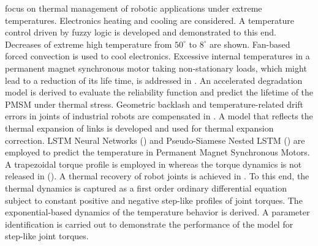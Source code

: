 \documentclass{ifacconf}
\begin{document}
\cite{afaq2023intelligent} focus on thermal management of robotic applications under extreme temperatures. Electronics heating and cooling are considered. A temperature control driven by fuzzy logic is developed and demonstrated to this end. Decreases of extreme high temperature from $50^{\circ}$ to $8^{\circ}$ are shown. Fan-based forced convection is used to cool electronics. Excessive internal temperatures in a permanent magnet synchronous motor  taking non-stationary loads, which might lead to a reduction of its life time, is addressed in \cite{chen2024lifetime}. An accelerated degradation model is derived to evaluate the reliability function and predict the lifetime of the PMSM under thermal stress.  Geometric backlash and temperature-related drift errors in joints of industrial robots are compensated in \cite{sigron2023compensation}. A model that reflects the thermal expansion of links is developed and used for thermal expansion correction.  LSTM Neural
Networks (\cite{he2024rotor})  and   Pseudo-Siamese Nested LSTM (\cite{cai2021temperature}) are employed to predict the temperature in Permanent Magnet Synchronous Motors. A trapezoidal torque profile is employed in \cite{he2024rotor} whereas the torque dynamics is not released in (\cite{cai2021temperature}). A thermal recovery of robot joints is achieved in  \cite{jorgensen2019thermal}. To this end, the thermal dynamics is captured as a first order ordinary differential equation subject to constant positive and negative step-like profiles of joint torques. The exponential-based dynamics of the temperature behavior is derived.  A parameter identification is carried out to demonstrate the performance of the model for step-like joint torques. %
\end{document}
